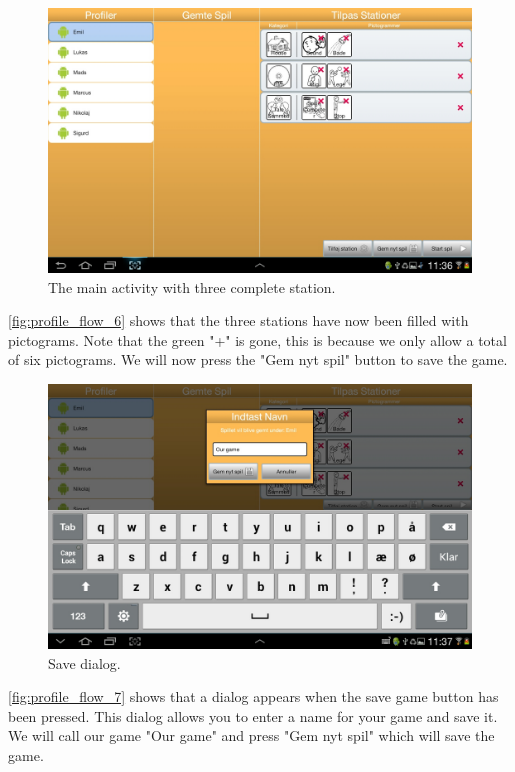 \begin{figure}[H]
\centering
\includegraphics[width=1.0\linewidth]{img/screenshots/profile_flow_6.jpg}%
\caption{The main activity with three complete station.}
\label{fig:profile_flow_6}
\end{figure}

\autoref{fig:profile_flow_6} shows that the three stations have now been filled with pictograms. Note that the green "+" is gone, this is because we only allow a total of six pictograms. We will now press the "Gem nyt spil" button to save the game.

\begin{figure}[H]
\centering
\includegraphics[width=1.0\linewidth]{img/screenshots/profile_flow_7.jpg}%
\caption{Save dialog.}
\label{fig:profile_flow_7}
\end{figure}

\autoref{fig:profile_flow_7} shows that a dialog appears when the save game button has been pressed. This dialog allows you to enter a name for your game and save it. We will call our game "Our game" and press "Gem nyt spil" which will save the game.

